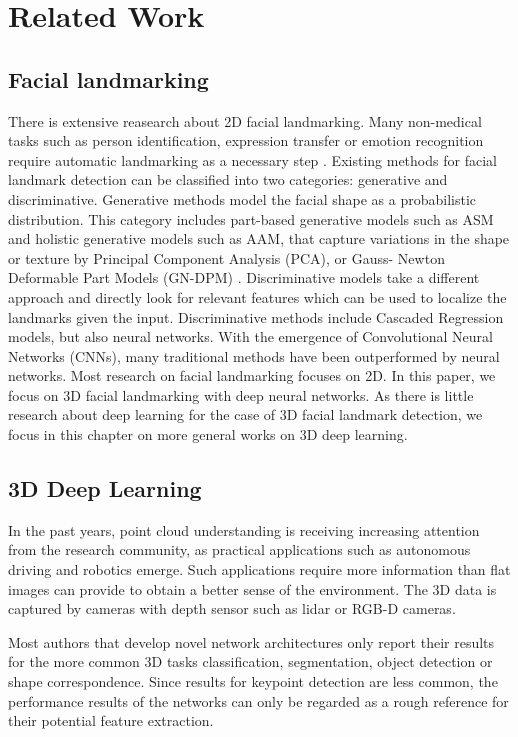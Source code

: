 \documentclass[class=article, crop=false]{standalone}
\begin{document}
\section{Related Work}
\label{sec:works}
\subsection{Facial landmarking}
There is extensive reasearch about 2D facial landmarking. Many non-medical tasks such as person identification, expression transfer or emotion recognition require automatic landmarking as a necessary step \cite{perrot:hal-02884592}. Existing methods for facial landmark detection can be classified into two categories: generative and discriminative. Generative methods model the facial shape as a probabilistic distribution. This category includes part-based generative models such as ASM and holistic generative models such as AAM, that capture variations in the shape or texture by Principal Component Analysis (PCA), or Gauss- Newton Deformable Part Models (GN-DPM) \cite{yan:hal-02892002}. Discriminative models take a different approach and directly look for relevant features which can be used to localize the landmarks given the input. Discriminative methods include Cascaded Regression models, but also neural networks. With the emergence of Convolutional Neural Networks (CNNs), many traditional methods have been outperformed by neural networks. Most research on facial landmarking focuses on 2D. In this paper, we focus on 3D facial landmarking with deep neural networks. As there is little research about deep learning for the case of 3D facial landmark detection, we focus in this chapter on more general works on 3D deep learning.

\subsection{3D Deep Learning}
In the past years, point cloud understanding is receiving increasing attention from the research community, as practical applications such as autonomous driving and robotics emerge. Such applications require more information than flat images can provide to obtain a better sense of the environment. The 3D data is captured by cameras with depth sensor such as lidar or RGB-D cameras. 

Most authors that develop novel network architectures only report their results for the more common 3D tasks classification, segmentation, object detection or shape correspondence. Since results for keypoint detection are less common, the performance results of the networks can only be regarded as a rough reference for their potential feature extraction.
\end{document}
